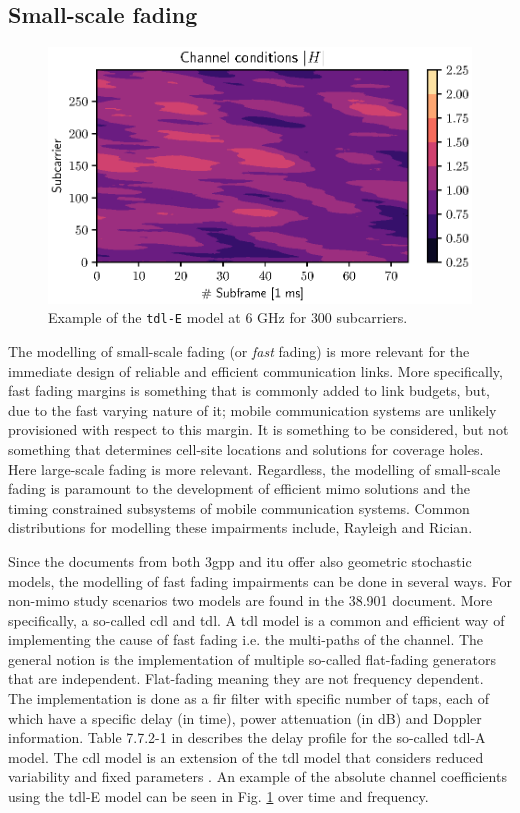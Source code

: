 \subsection{Small-scale fading}
\begin{figure}
    \centering
    \includegraphics{chapters/part_pathloss/figures/fast_fading_example.eps}
    \caption{Example of the \texttt{\gls{tdl}-E} model at $6$ GHz for $300$ subcarriers.} 
    \label{fig:fast_fading_example}
\end{figure}


The modelling of small-scale fading (or \emph{fast} fading) is more relevant for the immediate design of reliable and efficient communication links. More specifically, fast fading margins is something that is commonly added to link budgets, but, due to the fast varying nature of it; mobile communication systems are unlikely provisioned with respect to this margin. It is something to be considered, but not something that determines cell-site locations and solutions for coverage holes. Here large-scale fading is more relevant. Regardless, the modelling of small-scale fading is paramount to the development of efficient \gls{mimo} solutions and the timing constrained subsystems of mobile communication systems. Common distributions for modelling these impairments include, Rayleigh and Rician.

Since the documents from both \gls{3gpp} and \gls{itu} offer also geometric stochastic models, the modelling of fast fading impairments can be done in several ways. For non-\gls{mimo} study scenarios two models are found in the 38.901 document. More specifically, a so-called \gls{cdl} and \gls{tdl}. A \gls{tdl} model is a common and efficient way of implementing the cause of fast fading i.e. the multi-paths of the channel. The general notion is the implementation of multiple so-called flat-fading generators that are independent. Flat-fading meaning they are not frequency dependent. The implementation is done as a \gls{fir} filter with specific number of taps, each of which have a specific delay (in time),  power attenuation (in dB) and Doppler information. Table 7.7.2-1 in \cite{3GPP38901} describes the delay profile for the so-called \gls{tdl}-A model. The \gls{cdl} model is an extension of the \gls{tdl} model that considers reduced variability and fixed parameters \cite{ITU2412}. An example of the absolute channel coefficients using the \gls{tdl}-E model can be seen in Fig. \ref{fig:fast_fading_example} over time and frequency. 



